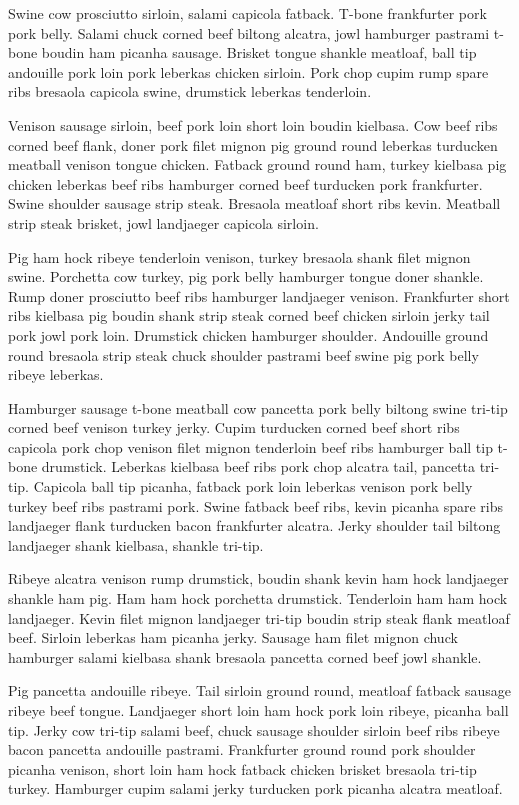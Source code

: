 Swine cow prosciutto sirloin, salami capicola fatback. T-bone frankfurter pork pork belly. Salami chuck corned beef biltong alcatra, jowl hamburger pastrami t-bone boudin ham picanha sausage. Brisket tongue shankle meatloaf, ball tip andouille pork loin pork leberkas chicken sirloin. Pork chop cupim rump spare ribs bresaola capicola swine, drumstick leberkas tenderloin.

Venison sausage sirloin, beef pork loin short loin boudin kielbasa.
Cow beef ribs corned beef flank,
doner pork filet mignon pig ground round leberkas turducken meatball venison tongue chick\-en.
Fatback ground round ham,
turkey kielbasa pig chicken leberkas beef ribs hamburger corned beef turducken pork frankfurter.
Swine shoulder sausage strip steak. Bresaola meatloaf short ribs kevin. Meatball strip steak brisket, jowl landjaeger capicola sirloin.

Pig ham hock ribeye tenderloin venison, turkey bresaola shank filet mignon swine. Porchetta cow turkey, pig pork belly hamburger tongue doner shankle. Rump doner prosciutto beef ribs hamburger landjaeger venison. Frankfurter short ribs kielbasa pig boudin shank strip steak corned beef chicken sirloin jerky tail pork jowl pork loin. Drumstick chicken hamburger shoulder. Andouille ground round bresaola strip steak chuck shoulder pastrami beef swine pig pork belly ribeye leberkas.

Hamburger sausage t-bone meatball cow pancetta pork belly biltong swine tri-tip corned beef venison turkey jerky. Cupim turducken corned beef short ribs capicola pork chop venison filet mignon tenderloin beef ribs hamburger ball tip t-bone drumstick. Leberkas kielbasa beef ribs pork chop alcatra tail, pancetta tri-tip. Capicola ball tip picanha, fatback pork loin leberkas venison pork belly turkey beef ribs pastrami pork. Swine fatback beef ribs, kevin picanha spare ribs landjaeger flank turducken bacon frankfurter alcatra. Jerky shoulder tail biltong landjaeger shank kielbasa, shankle tri-tip.

Ribeye alcatra venison rump drumstick, bou\-din shank kevin ham hock landjaeger shankle ham pig. Ham ham hock porchetta drumstick. Tenderloin ham ham hock landjaeger. Kevin filet mignon landjaeger tri-tip boudin strip steak flank meatloaf beef. Sirloin leberkas ham picanha jerky. Sausage ham filet mignon chuck hamburger salami kielbasa shank bresaola pancetta corned beef jowl shankle.

Pig pancetta andouille ribeye. Tail sirloin ground round, meatloaf fatback sausage ribeye beef tongue. Landjaeger short loin ham hock pork loin ribeye, picanha ball tip. Jerky cow tri-tip salami beef, chuck sausage shoulder sirloin beef ribs ribeye bacon pancetta andouille pastrami. Frankfurter ground round pork shoulder picanha venison, short loin ham hock fatback chicken brisket bresaola tri-tip turkey. Hamburger cupim salami jerky turducken pork picanha alcatra meatloaf.

